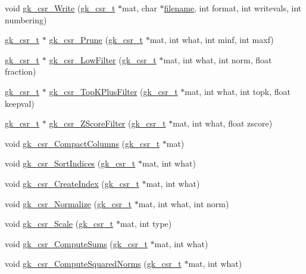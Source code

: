 \begin{DoxyCompactItemize}
void \hyperlink{a00023_a6eee009c30261b4b9450016267b4567c}{gk\+\_\+csr\+\_\+\+Write} (\hyperlink{a00634}{gk\+\_\+csr\+\_\+t} $\ast$mat, char $\ast$\hyperlink{a00623_a42a21beb8018ac623f4d09db1343b9cf}{filename}, int format, int writevals, int numbering)
\item 
\hyperlink{a00634}{gk\+\_\+csr\+\_\+t} $\ast$ \hyperlink{a00023_a06edc174c5986841b589900ffce6600f}{gk\+\_\+csr\+\_\+\+Prune} (\hyperlink{a00634}{gk\+\_\+csr\+\_\+t} $\ast$mat, int what, int minf, int maxf)
\item 
\hyperlink{a00634}{gk\+\_\+csr\+\_\+t} $\ast$ \hyperlink{a00023_a66729af11e7dee3585d6191661757c37}{gk\+\_\+csr\+\_\+\+Low\+Filter} (\hyperlink{a00634}{gk\+\_\+csr\+\_\+t} $\ast$mat, int what, int norm, float fraction)
\item 
\hyperlink{a00634}{gk\+\_\+csr\+\_\+t} $\ast$ \hyperlink{a00023_ad6f2c5699b47e1bc2285a1b391d7c7da}{gk\+\_\+csr\+\_\+\+Top\+K\+Plus\+Filter} (\hyperlink{a00634}{gk\+\_\+csr\+\_\+t} $\ast$mat, int what, int topk, float keepval)
\item 
\hyperlink{a00634}{gk\+\_\+csr\+\_\+t} $\ast$ \hyperlink{a00023_a193f32ef7dd91c2c633157bafea26080}{gk\+\_\+csr\+\_\+\+Z\+Score\+Filter} (\hyperlink{a00634}{gk\+\_\+csr\+\_\+t} $\ast$mat, int what, float zscore)
\item 
void \hyperlink{a00023_a3e15963be76870160707368a5fe7f693}{gk\+\_\+csr\+\_\+\+Compact\+Columns} (\hyperlink{a00634}{gk\+\_\+csr\+\_\+t} $\ast$mat)
\item 
void \hyperlink{a00023_a06ffa04d1369de42ae3b7d2a9f85b91d}{gk\+\_\+csr\+\_\+\+Sort\+Indices} (\hyperlink{a00634}{gk\+\_\+csr\+\_\+t} $\ast$mat, int what)
\item 
void \hyperlink{a00023_a8bdd383ab80fe76507463f59c3d2863a}{gk\+\_\+csr\+\_\+\+Create\+Index} (\hyperlink{a00634}{gk\+\_\+csr\+\_\+t} $\ast$mat, int what)
\item 
void \hyperlink{a00023_aa74b347c4a6a07c0b2ea15c7d67f27b0}{gk\+\_\+csr\+\_\+\+Normalize} (\hyperlink{a00634}{gk\+\_\+csr\+\_\+t} $\ast$mat, int what, int norm)
\item 
void \hyperlink{a00023_adf45acdb60028f87304c1edc75baf194}{gk\+\_\+csr\+\_\+\+Scale} (\hyperlink{a00634}{gk\+\_\+csr\+\_\+t} $\ast$mat, int type)
\item 
void \hyperlink{a00023_a3cc2a64b0ead1b41ad824bc9401f1b84}{gk\+\_\+csr\+\_\+\+Compute\+Sums} (\hyperlink{a00634}{gk\+\_\+csr\+\_\+t} $\ast$mat, int what)
\item 
void \hyperlink{a00023_adb5c0f634607e45daaf7098399f1da0e}{gk\+\_\+csr\+\_\+\+Compute\+Squared\+Norms} (\hyperlink{a00634}{gk\+\_\+csr\+\_\+t} $\ast$mat, int what)

\end{DoxyCompactItemize}
